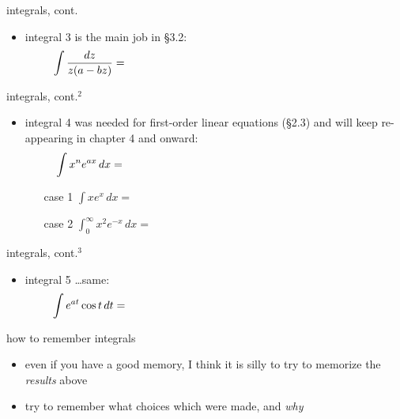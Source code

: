 \documentclass{beamer}
\begin{document}
\begin{frame}{integrals, cont.}

\begin{itemize}
\item {\color{blue} integral 3} is the main job in \S3.2:
    $$\int \frac{dz}{z(a-bz)} = \hspace{80mm}$$

\vspace{50mm}
\end{itemize}
\end{frame}


\begin{frame}{integrals, cont.$^2$}

\begin{itemize}
\item {\color{blue} integral 4} was needed for first-order linear equations (\S2.3) and will keep re-appearing in chapter 4 and onward:
    $$\int x^n e^{ax}\,dx = \hspace{80mm}$$

\vspace{40mm}
    \begin{itemize}
    \item[case 1] $\int x e^x\,dx = $
    
    \bigskip
    \item[case 2] $\int_0^\infty x^2 e^{-x}\,dx = $
    
    \bigskip
    \end{itemize}
\end{itemize}
\end{frame}


\begin{frame}{integrals, cont.$^3$}

\begin{itemize}
\item {\color{blue} integral 5} \dots same:
    $$\int e^{at} \cos t\,dt = \hspace{80mm}$$

\vspace{50mm}
\end{itemize}
\end{frame}


\begin{frame}{how to remember integrals}

\begin{itemize}
\item even if you have a good memory, I think it is silly to try to memorize the \emph{results} above
\item try to remember what choices which were made, and \emph{why}
\end{itemize}
\end{frame}
\end{document}
